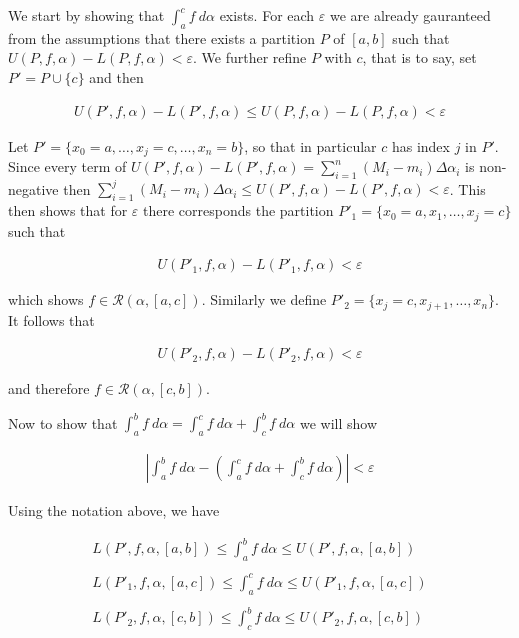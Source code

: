 \documentclass{article}
\begin{document}
  \vspace{1cm}

  We start by showing that $\int_a^c f\ d\alpha$ exists.  For each $\varepsilon$ we are already gauranteed from the assumptions that there exists a partition $P$ of $[a,b]$ such that $U(P,f,\alpha)-L(P,f,\alpha)<\varepsilon$.  We further refine $P$ with $c$, that is to say, set $P'=P\cup \{c\}$ and then

  \begin{align*}
    U(P',f,\alpha)-L(P',f,\alpha) \leq U(P,f,\alpha)-L(P,f,\alpha) < \varepsilon
  \end{align*}

  Let $P'=\{x_0=a,\dots,x_j=c,\dots,x_n=b\}$, so that in particular $c$ has index $j$ in $P'$.  Since every term of $\displaystyle U(P',f,\alpha)-L(P',f,\alpha) = \sum_{i=1}^n(M_i-m_i)\Delta \alpha_i$ is non-negative then $\displaystyle \sum_{i=1}^{j}(M_i-m_i)\Delta\alpha_i \leq U(P',f,\alpha)-L(P',f,\alpha)<\varepsilon$.  This then shows that for $\varepsilon$ there corresponds the partition $ P'_1 = \{x_0=a, x_1, \dots, x_{j}=c\}$ such that

  \begin{align*}
    U( P'_1, f, \alpha)-L(P'_1, f, \alpha) < \varepsilon
  \end{align*}

  which shows $f\in\mathscr R(\alpha,[a,c])$.  Similarly we define $P'_2 = \{x_j=c,x_{j+1},\dots,x_n\}$.  It follows that

  \begin{align*}
    U(P'_2,f,\alpha)-L(P'_2,f,\alpha) <\varepsilon
  \end{align*}

  and therefore $f\in \mathscr R(\alpha,[c,b])$.

  Now to show that $\int_a^bf\ d\alpha = \int_a^c f \ d\alpha + \int_c^b f\ d\alpha$ we will show

  \begin{align*}
    \left| \int_a^b f\ d\alpha - \left(\int_a^c f\ d\alpha + \int_c^b f\ d\alpha\right)\right|<\varepsilon
  \end{align*}

  Using the notation above, we have

  \begin{align*}
    L(P',f,\alpha,[a,b])\leq \int_a^b f \ d\alpha \leq U(P',f,\alpha,[a,b]) \\\\
    L(P'_1,f,\alpha,[a,c])\leq \int_a^c f \ d\alpha \leq U(P'_1,f,\alpha,[a,c]) \\\\
    L(P'_2,f,\alpha,[c,b])\leq \int_c^b f \ d\alpha \leq U(P'_2,f,\alpha,[c,b]) \\\\
  \end{align*}
\end{document}

